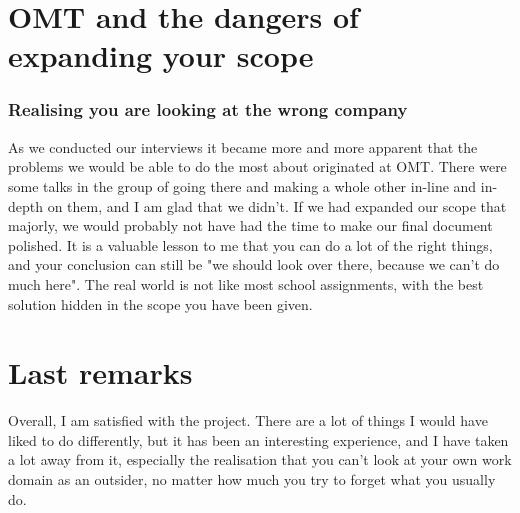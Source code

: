 
\section{OMT and the dangers of expanding your scope}
\subsubsection{Realising you are looking at the wrong company}
As we conducted our interviews it became more and more apparent that the problems we would be able to do the most about originated at OMT. There were some talks in the group of going there and making a whole other in-line and in-depth on them, and I am glad that we didn't. If we had expanded our scope that majorly, we would probably not have had the time to make our final document polished. 
It is a valuable lesson to me that you can do a lot of the right things, and your conclusion can still be "we should look over there, because we can't do much here". The real world is not like most school assignments, with the best solution hidden in the scope you have been given. 

\section{Last remarks}
Overall, I am satisfied with the project. There are a lot of things I would have liked to do differently, but it has been an interesting experience, and I have taken a lot away from it, especially the realisation that you can't look at your own work domain as an outsider, no matter how much you try to forget what you usually do.